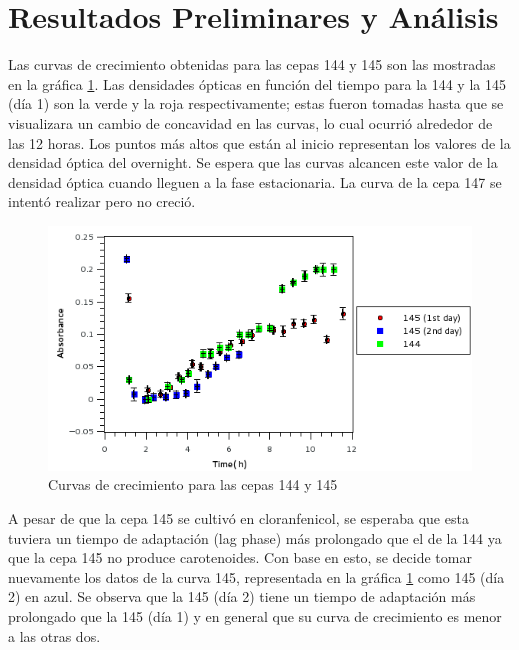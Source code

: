 \documentclass[%
 reprint,
 amsmath,amssymb,
 aps,
]{revtex4-1}
\begin{document}
\section{Resultados Preliminares y An\'alisis}
Las curvas de crecimiento obtenidas para las cepas 144 y 145 son las mostradas en la gráfica \ref{fig:cur1}. Las densidades ópticas en función del tiempo para la 144 y la 145 (día 1) son la verde y la roja respectivamente; estas fueron tomadas hasta que se visualizara un cambio de concavidad en las curvas, lo cual ocurrió alrededor de las 12 horas. Los puntos más altos que están al inicio representan los valores de la densidad óptica del overnight. Se espera que las curvas alcancen este valor de la densidad óptica cuando lleguen a la fase estacionaria. La curva de la cepa 147 se intentó realizar pero no creció.\\
\begin{figure}[h]
 \includegraphics[width=\linewidth]{curvas/gratodas.png}
  \caption{Curvas de crecimiento para las cepas 144 y 145}
  \label{fig:cur1}
\end{figure}
 A pesar de que la cepa 145 se cultivó en cloranfenicol, se esperaba que esta tuviera un tiempo de adaptación (lag phase) más prolongado que el de la 144 ya que la cepa 145 no produce carotenoides. Con base en esto, se decide tomar nuevamente los datos de la curva 145, representada en la gráfica  \ref{fig:cur1} como 145 (día 2) en azul. Se observa que la 145 (día 2) tiene un tiempo de adaptación más prolongado que la 145 (día 1) y en general que su curva de crecimiento es menor a las otras dos.\\
 
\end{document}
